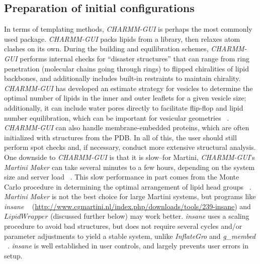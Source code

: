 \documentclass[9pt,bestpractices,pubversion]{livecoms}
\begin{document}
\subsection{Preparation of initial configurations}
\label{subsec:prepconf4}
In terms of templating methods, \textit{CHARMM-GUI} is perhaps the most commonly used package.
\textit{CHARMM-GUI} packs lipids from a library, then relaxes atom clashes on its own.
During the building and equilibration schemes, \textit{CHARMM-GUI} performs internal checks for ``disaster structures'' that can range from ring penetration (molecular chains going through rings) to flipped chiralities of lipid backbones, and additionally includes built-in restraints to maintain chirality.
\textit{CHARMM-GUI} has developed an estimate strategy for vesicles to determine the optimal number of lipids in the inner and outer leaflets for a given vesicle size; additionally, it can include water pores directly to facilitate flip-flop and lipid number equilibration, which can be important for vesicular geometries ~\cite{Qi2015a}.
\textit{CHARMM-GUI} can also handle membrane-embedded proteins, which are often initialized with structures from the PDB.
In all of this, the user should still perform spot checks and, if necessary, conduct more extensive structural analysis.
One downside to \textit{CHARMM-GUI} is that it is slow--for Martini, \textit{CHARMM-GUI}'s \textit{Martini Maker} can take several minutes to a few hours, depending on the system size and server load ~\cite{Qi2015a}.
This slow performance in part comes from the Monte Carlo procedure in determining the optimal arrangement of lipid head groups ~\cite{Wassenaar2015a}.
\textit{Martini Maker} is not the best choice for large Martini systems, but programs like \textit{insane}  ~\cite{Wassenaar2015a} (\url{http://www.cgmartini.nl/index.php/downloads/tools/239-insane}) and $LipidWrapper$ (discussed further below) may work better.
\textit{insane} uses a scaling procedure to avoid bad structures, but does not require several cycles and/or parameter adjustments to yield a stable system, unlike \textit{InflateGro} and \textit{g\_membed} ~\cite{Wassenaar2015a}.
\textit{insane} is well established in user controls, and largely prevents user errors in setup.
\end{document}
